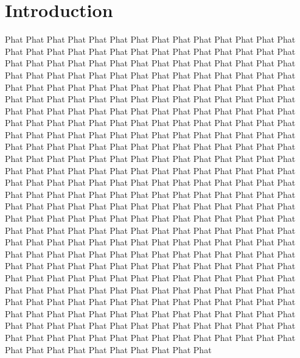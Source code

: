 \section{Introduction}
Phat Phat Phat Phat Phat Phat Phat Phat Phat Phat Phat Phat Phat Phat Phat Phat Phat Phat Phat Phat Phat Phat Phat Phat Phat Phat Phat Phat Phat Phat Phat Phat Phat Phat Phat Phat Phat Phat Phat Phat Phat Phat Phat Phat Phat Phat Phat Phat Phat Phat Phat Phat Phat Phat Phat Phat Phat Phat Phat Phat Phat Phat Phat Phat Phat Phat Phat Phat Phat Phat Phat Phat Phat Phat Phat Phat Phat Phat Phat Phat Phat Phat Phat Phat Phat Phat Phat Phat Phat Phat Phat Phat Phat Phat Phat Phat Phat Phat Phat Phat Phat Phat Phat Phat Phat Phat Phat Phat Phat Phat Phat Phat Phat Phat Phat Phat Phat Phat Phat Phat Phat Phat Phat Phat Phat Phat Phat Phat Phat Phat Phat Phat Phat Phat Phat Phat Phat Phat Phat Phat Phat Phat Phat Phat Phat Phat Phat Phat Phat Phat Phat Phat Phat Phat Phat Phat Phat Phat Phat Phat Phat Phat Phat Phat Phat Phat Phat Phat Phat Phat Phat Phat Phat Phat Phat Phat Phat Phat Phat Phat Phat Phat Phat Phat Phat Phat Phat Phat Phat Phat Phat Phat Phat Phat Phat Phat Phat Phat Phat Phat Phat Phat Phat Phat Phat Phat Phat Phat Phat Phat Phat Phat Phat Phat Phat Phat Phat Phat Phat Phat Phat Phat Phat Phat Phat Phat Phat Phat Phat Phat Phat Phat Phat Phat Phat Phat Phat Phat Phat Phat Phat Phat Phat Phat Phat Phat Phat Phat Phat Phat Phat Phat Phat Phat Phat Phat Phat Phat Phat Phat Phat Phat Phat Phat Phat Phat Phat Phat Phat Phat Phat Phat Phat Phat Phat Phat Phat Phat Phat Phat Phat Phat Phat Phat Phat Phat Phat Phat Phat Phat Phat Phat Phat Phat Phat Phat Phat Phat Phat Phat Phat Phat Phat Phat Phat Phat Phat Phat Phat Phat Phat Phat Phat Phat Phat Phat Phat Phat Phat Phat Phat Phat Phat Phat Phat Phat Phat Phat Phat Phat Phat Phat Phat Phat Phat Phat Phat Phat Phat Phat Phat Phat Phat Phat Phat Phat Phat Phat Phat Phat Phat Phat Phat Phat Phat Phat Phat Phat Phat Phat Phat Phat Phat Phat Phat Phat Phat Phat Phat Phat Phat Phat Phat Phat 
